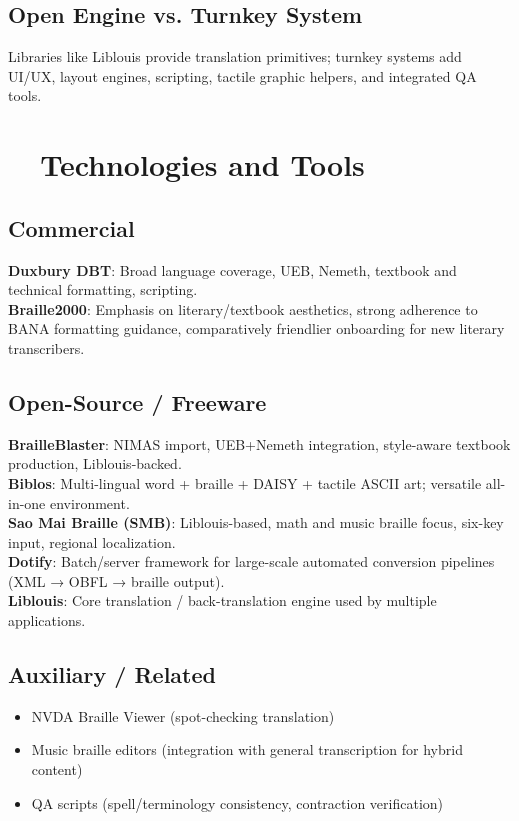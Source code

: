 \subsection*{Open Engine vs. Turnkey System}
Libraries like Liblouis provide translation primitives; turnkey systems add UI/UX, layout engines, scripting, tactile graphic helpers, and integrated QA tools.

\section{~~Technologies and Tools}
\label{sec:braille-tools}
\subsection*{Commercial}
\textbf{Duxbury DBT}\supercite{Duxbury}: Broad language coverage, UEB, Nemeth, textbook and technical formatting, scripting. \\
\textbf{Braille2000}\supercite{Braille2000}: Emphasis on literary/textbook aesthetics, strong adherence to BANA formatting guidance, comparatively friendlier onboarding for new literary transcribers.

\subsection*{Open-Source / Freeware}
\textbf{BrailleBlaster}\supercite{BrailleBlaster}: NIMAS import, UEB+Nemeth integration, style-aware textbook production, Liblouis-backed. \\
\textbf{Biblos}\supercite{Biblos}: Multi-lingual word  + braille + DAISY + tactile ASCII art; versatile all-in-one environment. \\
\textbf{Sao Mai Braille (SMB)}\supercite{SMB}: Liblouis-based, math and music braille focus, six-key input, regional localization. \\
\textbf{Dotify}\supercite{Dotify}: Batch/server framework for large-scale automated conversion pipelines (XML → OBFL → braille output). \\
\textbf{Liblouis}\supercite{Liblouis}: Core translation / back-translation engine used by multiple applications.

\subsection*{Auxiliary / Related}
\begin{itemize}
	\item NVDA Braille Viewer (spot-checking translation)
	\item Music braille editors (integration with general transcription for hybrid content)
	\item QA scripts (spell/terminology consistency, contraction verification)
\end{itemize}

